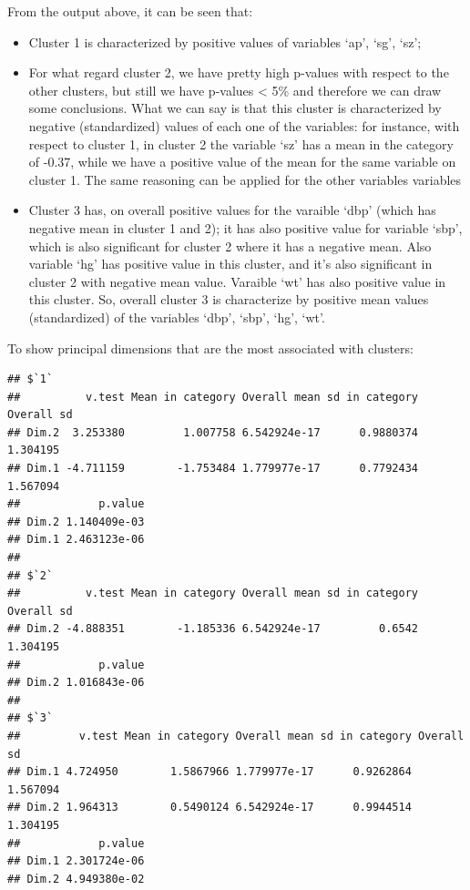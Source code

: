 \documentclass[
]{article}
\newenvironment{Shaded}{\begin{snugshade}}{\end{snugshade}}
\newcommand{\NormalTok}[1]{#1}
\newcommand{\SpecialCharTok}[1]{\textcolor[rgb]{0.00,0.00,0.00}{#1}}
\providecommand{\tightlist}{%
  \setlength{\itemsep}{0pt}\setlength{\parskip}{0pt}}
\begin{document}
From the output above, it can be seen that:

\begin{itemize}
\tightlist
\item
  Cluster 1 is characterized by positive values of variables `ap', `sg',
  `sz';
\item
  For what regard cluster 2, we have pretty high p-values with respect
  to the other clusters, but still we have p-values \textless{} 5\% and
  therefore we can draw some conclusions. What we can say is that this
  cluster is characterized by negative (standardized) values of each one
  of the variables: for instance, with respect to cluster 1, in cluster
  2 the variable `sz' has a mean in the category of -0.37, while we have
  a positive value of the mean for the same variable on cluster 1. The
  same reasoning can be applied for the other variables variables
\item
  Cluster 3 has, on overall positive values for the varaible `dbp'
  (which has negative mean in cluster 1 and 2); it has also positive
  value for variable `sbp', which is also significant for cluster 2
  where it has a negative mean. Also variable `hg' has positive value in
  this cluster, and it's also significant in cluster 2 with negative
  mean value. Varaible `wt' has also positive value in this cluster. So,
  overall cluster 3 is characterize by positive mean values
  (standardized) of the variables `dbp', `sbp', `hg', `wt'.
\end{itemize}

To show principal dimensions that are the most associated with clusters:

\begin{Shaded}
\end{Shaded}

\begin{verbatim}
## $`1`
##          v.test Mean in category Overall mean sd in category Overall sd
## Dim.2  3.253380         1.007758 6.542924e-17      0.9880374   1.304195
## Dim.1 -4.711159        -1.753484 1.779977e-17      0.7792434   1.567094
##            p.value
## Dim.2 1.140409e-03
## Dim.1 2.463123e-06
## 
## $`2`
##          v.test Mean in category Overall mean sd in category Overall sd
## Dim.2 -4.888351        -1.185336 6.542924e-17         0.6542   1.304195
##            p.value
## Dim.2 1.016843e-06
## 
## $`3`
##         v.test Mean in category Overall mean sd in category Overall sd
## Dim.1 4.724950        1.5867966 1.779977e-17      0.9262864   1.567094
## Dim.2 1.964313        0.5490124 6.542924e-17      0.9944514   1.304195
##            p.value
## Dim.1 2.301724e-06
## Dim.2 4.949380e-02
\end{verbatim}
\end{document}
